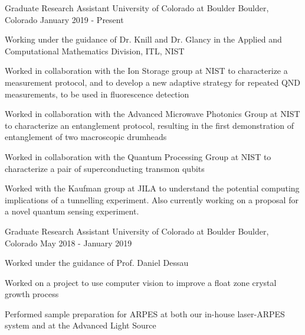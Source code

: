 

\begin{cventries}

  \cventry
    {Graduate Research Assistant} %
    {University of Colorado at Boulder} %
    {Boulder, Colorado} %
    {January 2019 - Present} %
    {
      \begin{cvitems} %
        \item {Working under the guidance of Dr. Knill and Dr. Glancy in the Applied and Computational Mathematics Division, ITL, NIST}
        \item {Worked in collaboration with the Ion Storage group at NIST to
          characterize a measurement protocol, and to develop a new adaptive
        strategy for repeated QND measurements, to be used in fluorescence
      detection}
    \item {Worked in collaboration with the Advanced Microwave Photonics Group
      at NIST to characterize an entanglement protocol, resulting in the first
    demonstration of entanglement of two macroscopic drumheads}
  \item {Worked in collaboration with the Quantum Processing Group at NIST to
    characterize a pair of superconducting transmon qubits}
  \item {Worked with the Kaufman group at JILA to understand the potential
    computing implications of a tunnelling experiment. Also currently working
  on a proposal for a novel quantum sensing experiment.}
      \end{cvitems}
    }

  \cventry
    {Graduate Research Assistant} %
    {University of Colorado at Boulder} %
    {Boulder, Colorado} %
    {May 2018 - January 2019} %
    {
      \begin{cvitems} %
        \item {Worked under the guidance of Prof. Daniel Dessau}
        \item {Worked on a project to use computer vision to improve a float
          zone crystal growth process}
        \item {Performed sample preparation for ARPES at both our in-house
          laser-ARPES system and at the Advanced Light Source}
      \end{cvitems}
    }


\end{cventries}
